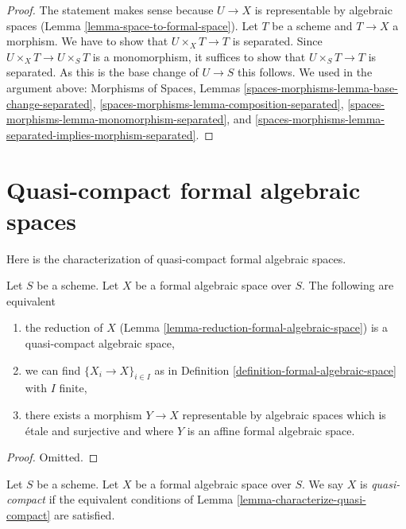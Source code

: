 \begin{proof}
The statement makes sense because $U \to X$ is representable by
algebraic spaces (Lemma \ref{lemma-space-to-formal-space}).
Let $T$ be a scheme and $T \to X$ a morphism. We have to show
that $U \times_X T \to T$ is separated. Since $U \times_X T \to U \times_S T$
is a monomorphism, it suffices to show that $U \times_S T \to T$
is separated. As this is the base change of $U \to S$ this
follows. We used in the argument above:
Morphisms of Spaces, Lemmas
\ref{spaces-morphisms-lemma-base-change-separated},
\ref{spaces-morphisms-lemma-composition-separated},
\ref{spaces-morphisms-lemma-monomorphism-separated}, and
\ref{spaces-morphisms-lemma-separated-implies-morphism-separated}.
\end{proof}




\section{Quasi-compact formal algebraic spaces}
\label{section-quasi-compact}

\noindent
Here is the characterization of quasi-compact formal algebraic
spaces.

\begin{lemma}
\label{lemma-characterize-quasi-compact}
Let $S$ be a scheme. Let $X$ be a formal algebraic space over $S$.
The following are equivalent
\begin{enumerate}
\item the reduction of $X$
(Lemma \ref{lemma-reduction-formal-algebraic-space}) is a quasi-compact
algebraic space,
\item we can find $\{X_i \to X\}_{i \in I}$ as in
Definition \ref{definition-formal-algebraic-space} with $I$ finite,
\item there exists a morphism $Y \to X$ representable by algebraic
spaces which is \'etale and surjective and where
$Y$ is an affine formal algebraic space.
\end{enumerate}
\end{lemma}

\begin{proof}
Omitted.
\end{proof}

\begin{definition}
\label{definition-quasi-compact}
Let $S$ be a scheme. Let $X$ be a formal algebraic space over $S$.
We say $X$ is {\it quasi-compact} if the equivalent conditions of
Lemma \ref{lemma-characterize-quasi-compact} are satisfied.
\end{definition}

